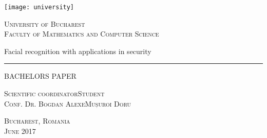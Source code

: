 \begin{titlepage}
	\begin{center}

		\texttt{[image: university]}

		\vspace{0.5cm}
		\LARGE \textsc{University of Bucharest}
		\\
		\vspace{0.5cm}
		\Large \textsc{Faculty of Mathematics and Computer Science}

		\vfill

		\Huge Facial recognition with applications in security
		\rule{\textwidth}{1pt}
		\Large BACHELORS PAPER

		\vfill

		\Large
		\textsc{Scientific coordinator}\hfill \textsc{Student}
		\\
		\large
		\textsc{Conf. Dr. Bogdan Alexe}\hfill \textsc{Mușuroi Doru}
	
		\vspace{1.5cm}
		\textsc{Bucharest, Romania}\\
		\textsc{June 2017}

	\end{center}
\end{titlepage}
 
